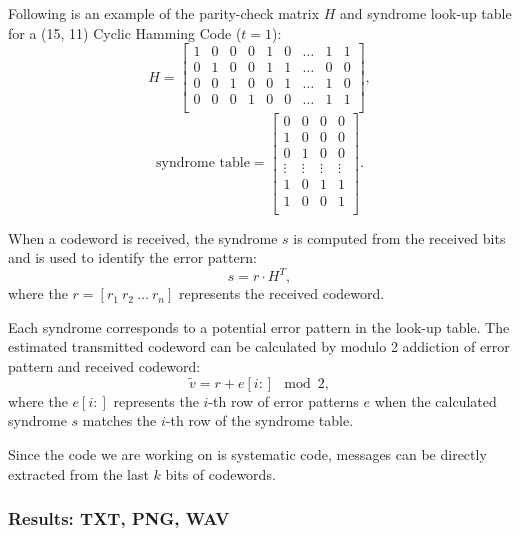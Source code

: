 \documentclass{article}
\begin{document}
Following is an example of the parity-check matrix $H$ and syndrome look-up table for a (15, 11) Cyclic Hamming Code ($t=1$):
\begin{equation*}
H = 
\begin{bmatrix}
1 & 0 & 0 & 0 & 1 & 0 & \dots & 1 & 1 \\
0 & 1 & 0 & 0 & 1 & 1 & \dots & 0 & 0 \\
0 & 0 & 1 & 0 & 0 & 1 & \dots & 1 & 0 \\
0 & 0 & 0 & 1 & 0 & 0 & \dots & 1 & 1 \\
\end{bmatrix} ,
\end{equation*}
\begin{equation}
\text{syndrome table} = 
\begin{bmatrix}
0 & 0 & 0 & 0 \\
1 & 0 & 0 & 0 \\
0 & 1 & 0 & 0 \\
\vdots & \vdots & \vdots & \vdots \\
1 & 0 & 1 & 1 \\
1 & 0 & 0 & 1 \\
\end{bmatrix} .
\end{equation}



When a codeword is received, the syndrome $s$ is computed from the received bits and is used to identify the error pattern:
\begin{equation*}
    s = r \cdot H^T ,
\end{equation*}
where the $r = [r_1\  r_2\  \dots\  r_n ]$ represents the received codeword. 

Each syndrome corresponds to a potential error pattern in the look-up table. The estimated transmitted codeword can be calculated by modulo 2 addiction of error pattern and received codeword:
\begin{equation*}
    \tilde{v} = r + e[i:] \mod 2 ,
\end{equation*}
where the $e[i:]$ represents the $i$-th row of error patterns $e$ when the calculated syndrome $s$ matches the $i$-th row of the syndrome table. 

Since the code we are working on is systematic code, messages can be directly extracted from the last $k$ bits of codewords. 


\subsubsection{Results: TXT, PNG, WAV}
\end{document}
